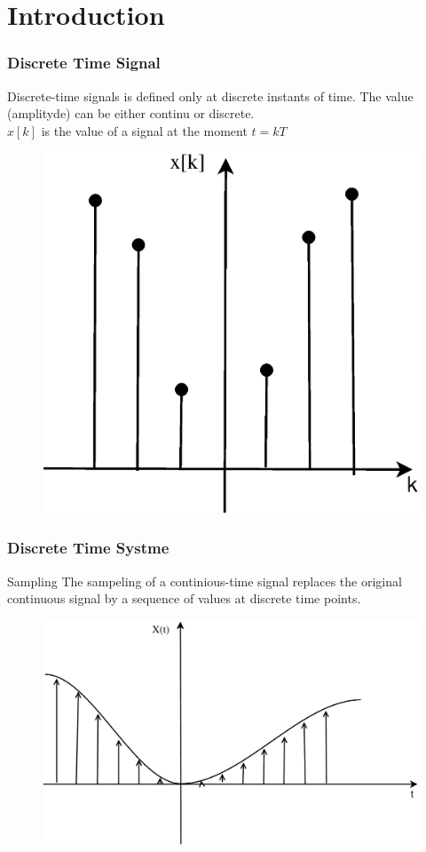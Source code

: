 \section{Introduction}

\def\Z{$\mathbb{Z}$}
\def\R{$\mathbb{R}$}
\begin{frame}
	\frametitle{Discrete Time Signal}
	\begin{definition}
		Discrete-time signals is defined only at discrete instants of time. The value (amplityde) can be either continu or discrete.\\
		$x[k]$ is the value of a signal at the moment $t = kT$
	\end{definition}
	\begin{example}
		\begin{figure}
		\centering
		\includegraphics[width=0.25\linewidth]{Images/Discrete_time_eps_1.eps}
\end{figure}

	\end{example}
\end{frame}
\begin{frame}
	\frametitle{Discrete Time Systme}
	\begin{block}{Sampling}
		The sampeling of a continious-time signal replaces the original continuous signal by a sequence of values at discrete time points.
		\begin{figure}
\centering
\includegraphics[width=0.5\linewidth]{Images/Discrete_time_eps_4}
\end{figure}

	\end{block}
\end{frame}
